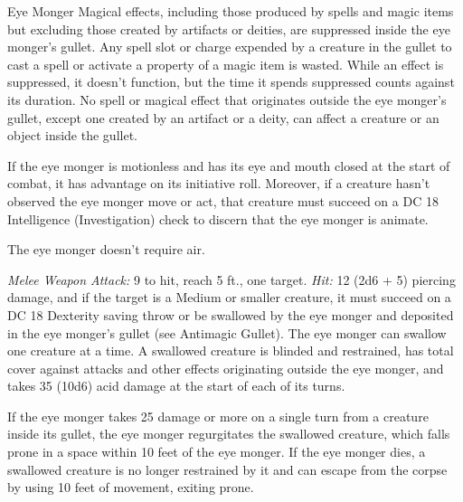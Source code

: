\documentclass[10pt,a4paper,twoside,bg=print,twocolumn,openany,nodeprecatedcode]{dndbook}
\begin{document}
\begin{DndMonster}[float=t]{Eye Monger}
\DndMonsterBasics[
armor-class = {17 (natural armor)},
hit-points = {\DndDice{13d10 + 78}},
speed = {0 ft., fly 20 ft. \textit{(hover)}}
]
\DndMonsterAbilityScores[
 str = 21,
 dex = 6,
 con = 23,
 int = 7,
 wis = 13,
 cha = 7
]
\DndMonsterDetails[
senses = {darkvision 120 ft., blindsight 120 ft. while the eye monger's eye is closed, passive perception 11},
languages = {Deep Speech},
challenge = 10,
]
Magical effects, including those produced by spells and magic items but excluding those created by artifacts or deities, are suppressed inside the eye monger's gullet. Any spell slot or charge expended by a creature in the gullet to cast a spell or activate a property of a magic item is wasted. While an effect is suppressed, it doesn't function, but the time it spends suppressed counts against its duration. No spell or magical effect that originates outside the eye monger's gullet, except one created by an artifact or a deity, can affect a creature or an object inside the gullet.

If the eye monger is motionless and has its eye and mouth closed at the start of combat, it has advantage on its initiative roll. Moreover, if a creature hasn't observed the eye monger move or act, that creature must succeed on a DC 18 Intelligence (Investigation) check to discern that the eye monger is animate.

The eye monger doesn't require air.

\textsl{Melee Weapon Attack:} 9 to hit, reach 5 ft., one target. \textsl{Hit:} 12 (2d6 + 5) piercing damage, and if the target is a Medium or smaller creature, it must succeed on a DC 18 Dexterity saving throw or be swallowed by the eye monger and deposited in the eye monger's gullet (see Antimagic Gullet). The eye monger can swallow one creature at a time. A swallowed creature is blinded and restrained, has total cover against attacks and other effects originating outside the eye monger, and takes 35 (10d6) acid damage at the start of each of its turns.

If the eye monger takes 25 damage or more on a single turn from a creature inside its gullet, the eye monger regurgitates the swallowed creature, which falls prone in a space within 10 feet of the eye monger. If the eye monger dies, a swallowed creature is no longer restrained by it and can escape from the corpse by using 10 feet of movement, exiting prone.

\end{DndMonster}
\end{document}
